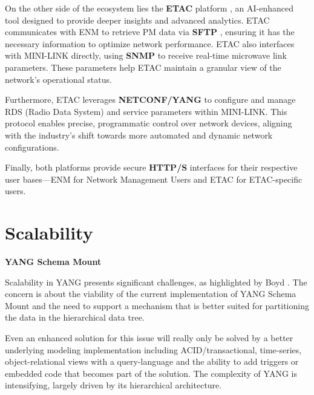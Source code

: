\documentclass[11pt,sigconf]{iabart}
\begin{document}
On the other side of the ecosystem lies the \textbf{ETAC} platform \cite{ericsson-etac}, an AI-enhanced tool designed to provide deeper insights and advanced analytics. ETAC communicates with ENM to retrieve PM data via \textbf{SFTP} \cite{RFC4253}, ensuring it has the necessary information to optimize network performance. ETAC also interfaces with MINI-LINK directly, using \textbf{SNMP} \cite{RFC1157} to receive real-time microwave link parameters. These parameters help ETAC maintain a granular view of the network's operational status.

Furthermore, ETAC leverages \textbf{NETCONF/YANG} \cite{RFC6241, rfc6020} to configure and manage RDS (Radio Data System) and service parameters within MINI-LINK. This protocol enables precise, programmatic control over network devices, aligning with the industry's shift towards more automated and dynamic network configurations.

Finally, both platforms provide secure \textbf{HTTP/S} \cite{RFC7230} interfaces for their respective user bases—ENM for Network Management Users and ETAC for ETAC-specific users. 


\section{Scalability} \label{scalability}

 

\textbf{YANG Schema Mount}

Scalability in YANG presents significant challenges, as highlighted by Boyd \cite{boyd2023scalable}. The concern is about the viability of the current implementation of YANG Schema Mount \cite{RFC8528} and the need to support a mechanism that is better suited for partitioning the data in the hierarchical data tree.

Even an enhanced solution for this issue will really only be solved by a better underlying modeling implementation including ACID/transactional, time-series, object-relational views with a query-language and the ability to add triggers or embedded code that becomes part of the solution. The complexity of YANG is intensifying, largely driven by its hierarchical architecture.
\end{document}

